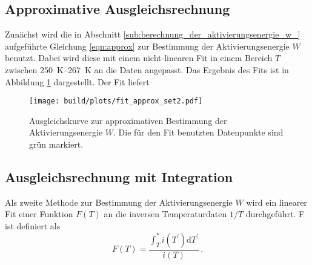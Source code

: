 \subsection{Approximative Ausgleichsrechnung}
\label{subsec:approx}
Zunächst wird die in Abschnitt \ref{sub:berechnung_der_aktivierungsenergie_w_}
aufgeführte Gleichung \ref{eqn:approx} zur Bestimmung der Aktivierungsenergie
$W$ benutzt. Dabei wird diese mit einem nicht-linearen Fit in einem Bereich
$T$ zwischen \SIrange{250}{267}{\kelvin} an die Daten angepasst.
Das Ergebnis des Fits ist in Abbildung \ref{fig:fit_approx_set2} dargestellt.
Der Fit liefert
\begin{equation*}
    
\end{equation*}
\begin{figure}
    \centering
    \texttt{[image: build/plots/fit\_approx\_set2.pdf]}
    \caption{Ausgleichskurve zur approximativen Bestimmung der
    Aktivierungsenergie $W$. Die für den Fit benutzten Datenpunkte
    sind grün markiert.}
    \label{fig:fit_approx_set2}
\end{figure}

\subsection{Ausgleichsrechnung mit Integration}
\label{subsec:integration}
Als zweite Methode zur Bestimmung der Aktivierungsenergie $W$ wird ein
linearer Fit einer Funktion $F(T)$ an die inversen Temperaturdaten $1/T$
durchgeführt.
F ist definiert als
\begin{equation*}
    F(T) = \frac{\int_T^\ast i(T^\prime)\mathrm{d}T^\prime}{i(T)}\,.
\end{equation*}
